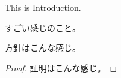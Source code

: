 \documentclass[b5paper,draft,oneside,openany]{ltjsbook} %
\begin{document}
This is Introduction.

\begin{thm}[なんかすごい定理]
    すごい感じのこと。
    \begin{policy}
        方針はこんな感じ。
    \end{policy}

    \begin{proof}
        証明はこんな感じ。
    \end{proof}
\end{thm}
\end{document}
